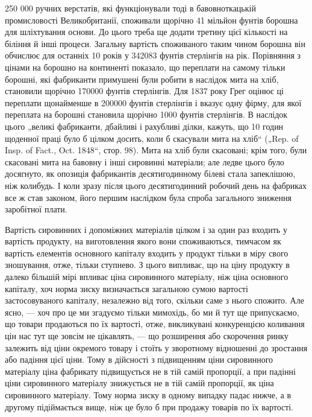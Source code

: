 \parcont{}  %
250 000 ручних верстатів, які функціонували тоді в бавовноткацькій
промисловості Великобританії, споживали щорічно 41 мільйон
фунтів борошна для шліхтування основи. До цього треба
ще додати третину цієї кількості на біління й інші процеси.
Загальну вартість споживаного таким чином борошна він обчислює
для останніх 10 років у 342083 фунтів стерлінгів на рік.
Порівняння з цінами на борошно на континенті показало, що
переплати на самому тільки борошні, які фабриканти примушені
були робити в наслідок мита на хліб, становили щорічно
170000 фунтів стерлінгів. Для 1837 року Грег оцінює ці
переплати щонайменше в 200000 фунтів стерлінгів і вказує
одну фірму, для якої переплата на борошні становила щорічно
1000 фунтів стерлінгів. В наслідок цього „великі фабриканти,
дбайливі і рахубливі ділки, кажуть, що 10 годин щоденної
праці було б цілком досить, коли б скасували мита на хліб“
(„Rep. of Insp. of Fact., Oct. 1848“, стор. 98). Мита на хліб
були скасовані; крім того, були скасовані мита на бавовну
і інші сировинні матеріали; але ледве цього було досягнуто, як
опозиція фабрикантів десятигодинному білеві стала запеклішою,
ніж колибудь. І коли зразу після цього десятигодинний робочий
день на фабриках все ж став законом, його першим наслідком
була спроба загального зниження заробітної плати.

Вартість сировинних і допоміжних матеріалів цілком і за один
раз входить у вартість продукту, на виготовлення якого вони споживаються,
тимчасом як вартість елементів основного капіталу
входить у продукт тільки в міру свого зношування, отже, тільки
ступнево. З цього випливає, що на ціну продукту в далеко більшій
мірі впливає ціна сировинного матеріалу, ніж ціна основного
капіталу, хоч норма зиску визначається загальною сумою вартості
застосовуваного капіталу, незалежно від того, скільки
саме з нього спожито. Але ясно, — хоч про це ми згадуємо
тільки мимохідь, бо ми й тут ще припускаємо, що товари продаються
по їх вартості, отже, викликувані конкуренцією коливання
цін нас тут ще зовсім не цікавлять, — що розширення або
скорочення ринку залежить від ціни окремого товару і стоїть
у зворотному відношенні до зростання або падіння цієї ціни.
Тому в дійсності з підвищенням ціни сировинного матеріалу ціна
фабрикату підвищується не в тій самій пропорції, а при падінні
ціни сировинного матеріалу знижується не в тій самій пропорції,
як ціна сировинного матеріалу. Тому норма зиску в
одному випадку падає нижче, а в другому підіймається вище,
ніж це було б при продажу товарів по їх вартості.

